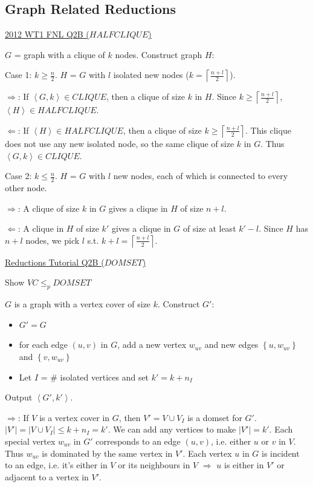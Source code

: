 \documentclass[10pt,landscape,a4paper]{article}
\newcommand{\set}[1]{\left \{ #1 \right \}}
\newcommand{\abs}[1]{\left | #1 \right |}
\newcommand{\ceil}[1]{\left \lceil #1 \right \rceil}
\newcommand{\encoding}[1]{\left \langle #1 \right \rangle}
\begin{document}
\begin{multicols*}{3}
\subsection{Graph Related Reductions}

\underline{2012 WT1 FNL Q2B ($HALFCLIQUE$)}

$G$ = graph with a clique of $k$ nodes. Construct graph $H$:

Case 1: $k \geq \frac{n}{2}$. $H$ = $G$ with $l$ isolated new nodes ($k = \ceil{\frac{n + l}{2}}$).

$\Rightarrow$: If $\encoding{G, k} \in CLIQUE$, then a clique of size $k$ in $H$. Since $k \geq \ceil{\frac{n + l}{2}}$, $\encoding{H} \in HALFCLIQUE$.

$\Leftarrow$: If $\encoding{H} \in HALFCLIQUE$, then a clique of size $k \geq \ceil{\frac{n + l}{2}}$. This clique does not use any new isolated node, so the same clique of size $k$ in $G$. Thus $\encoding{G, k} \in CLIQUE$.

Case 2: $k \leq \frac{n}{2}$. $H$ = $G$ with $l$ new nodes, each of which is connected to every other node.

$\Rightarrow$: A clique of size $k$ in $G$ gives a clique in $H$ of size $n + l$.

$\Leftarrow$: A clique in $H$ of size $k'$ gives a clique in $G$ of size at least $k' - l$. Since $H$ has $n + l$ nodes, we pick $l$ s.t. $k + l = \ceil{\frac{n + l}{2}}$.

\underline{Reductions Tutorial Q2B ($DOMSET$)}

Show $VC \leq_p DOMSET$

$G$ is a graph with a vertex cover of size $k$. Construct $G'$:

\begin{itemize}
    \item $G' = G$
    \item for each edge $(u, v)$ in $G$, add a new vertex $w_{uv}$ and new edges $\set{u, w_{uv}}$ and $\set{v, w_{uv}}$
    \item Let $I$ = \# isolated vertices and set $k' = k + n_I$
\end{itemize}

Output $\encoding{G', k'}$.

$\Rightarrow$: If $V$ is a vertex cover in $G$, then $V' = V \cup V_I$ is a domset for $G'$. $\abs{V'} = \abs{V \cup V_I} \leq k + n_I = k'$. We can add any vertices to make $\abs{V'} = k'$. Each special vertex $w_{uv}$ in $G'$ corresponds to an edge $(u, v)$, i.e. either $u$ or $v$ in $V$. Thus $w_{uv}$ is dominated by the same vertex in $V'$. Each vertex $u$ in $G$ is incident to an edge, i.e. it's either in $V$ or its neighbours in $V$ $\Rightarrow$ $u$ is either in $V'$ or adjacent to a vertex in $V'$.


\end{multicols*}
\end{document}
